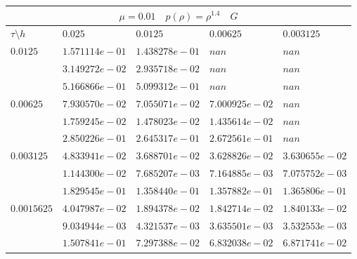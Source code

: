 \documentclass[a4paper,12pt]{extarticle}
\begin{document}
\begin{tabular}{|l|l|l|l|l|}
	\hline
	\multicolumn{5}{|c|}{$\mu =0.01 \quad  p(\rho) = \rho^{1.4} \quad G$}\\
	\hline
	$\tau\setminus h$ & $0.025$ & $0.0125$ & $0.00625$ & $0.003125$\\
	\hline
	$0.0125$  & $1.571114e-01$ & $1.438278e-01$ & $nan$ & $nan$\\
	& $3.149272e-02$ & $2.935718e-02$ & $nan$ & $nan$\\
	& $5.166866e-01$ & $5.099312e-01$ & $nan$ & $nan$\\
	\hline
	$0.00625$  & $7.930570e-02$ & $7.055071e-02$ & $7.000925e-02$ & $nan$\\
	& $1.759245e-02$ & $1.478023e-02$ & $1.435614e-02$ & $nan$\\
	& $2.850226e-01$ & $2.645317e-01$ & $2.672561e-01$ & $nan$\\
	\hline
	$0.003125$  & $4.833941e-02$ & $3.688701e-02$ & $3.628826e-02$ & $3.630655e-02$\\
	& $1.144300e-02$ & $7.685207e-03$ & $7.164885e-03$ & $7.075752e-03$\\
	& $1.829545e-01$ & $1.358440e-01$ & $1.357882e-01$ & $1.365806e-01$\\
	\hline
	$0.0015625$  & $4.047987e-02$ & $1.894378e-02$ & $1.842714e-02$ & $1.840133e-02$\\
	& $9.034944e-03$ & $4.321537e-03$ & $3.635501e-03$ & $3.532553e-03$\\
	& $1.507841e-01$ & $7.297388e-02$ & $6.832038e-02$ & $6.871741e-02$\\
	\hline
\end{tabular}
\end{document}
